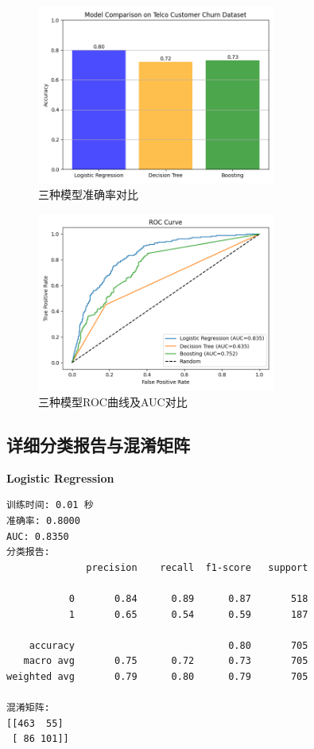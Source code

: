 \documentclass[12pt,a4paper]{article}
\begin{document}
\begin{figure}[H]
    \centering
    \includegraphics[width=0.7\textwidth]{model_comparison.png}
    \caption{三种模型准确率对比}
\end{figure}

\begin{figure}[H]
    \centering
    \includegraphics[width=0.7\textwidth]{roc_curve.png}
    \caption{三种模型ROC曲线及AUC对比}
\end{figure}

\subsection{详细分类报告与混淆矩阵}

\textbf{Logistic Regression}
\begin{lstlisting}
训练时间: 0.01 秒
准确率: 0.8000
AUC: 0.8350
分类报告:
              precision    recall  f1-score   support

           0       0.84      0.89      0.87       518
           1       0.65      0.54      0.59       187

    accuracy                           0.80       705
   macro avg       0.75      0.72      0.73       705
weighted avg       0.79      0.80      0.79       705

混淆矩阵:
[[463  55]
 [ 86 101]]
\end{lstlisting}
\end{document}
